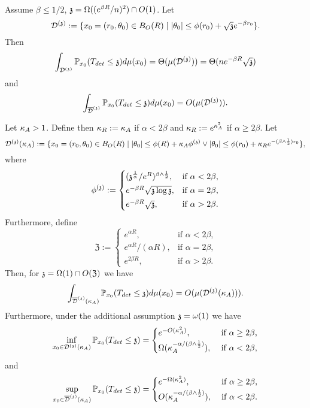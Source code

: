 \begin{theorem}\label{thm:mixedSmall} 
Assume $\beta \le 1/2$,  $\ss=\Omega((e^{\beta R}/n)^2)\cap O(1)$. Let
\begin{equation}\label{mix:lower:defD}
\dt := \{ x_0=(r_0,\theta_0)\in B_O(R) \mid |\theta_0|\leq \phi(r_0) +\sqrt{\ss}e^{-\beta r_0} \}. 
\end{equation}
Then 
\[
\int_{\dt} \PP_{x_0}(T_{det}\leq\ss)d\mu(x_0)=\Theta(\mu(\dt))=\Theta(n e^{-\beta R}\sqrt{\ss})
\]
and 
\[
\int_{\ndt} \PP_{x_0}(T_{det}\leq\ss)d\mu(x_0)=O(\mu(\dt)).
\]
\end{theorem}
\begin{theorem}\label{thm:mixedLarge}
Let $\KA > 1$. Define then $\KR:=\KA$ if $\alpha < 2\beta$ and $\KR:=e^{\KA^2}$ if $\alpha \ge 2\beta$. Let 
\[
\dt(\KA):=\{x_0=(r_0,\theta_0)\in B_O(R) \mid |\theta_0|\leq\phi(R)+\KA\phis \vee |\theta_0|\leq \phi(r_0)+\KR e^{-(\beta\wedge\frac12) r_0}\}, 
\]
where 
\[\phis:=\begin{cases}
(\ss^{\frac{1}{\alpha}}/e^R)^{\beta\wedge\frac{1}{2}}, 
 & \text{if $\alpha<2\beta$},\\[2pt]
e^{-\beta R}\sqrt{\ss \log\ss}, & \text{if $\alpha=2\beta$},\\[2pt]
e^{-\beta R}\sqrt{\ss},&\text{if $\alpha>2\beta$}.
\end{cases}
\]
Furthermore, define $$\mathfrak{Z} := \begin{cases}
e^{\alpha R}, &
\text{if $\alpha < 2\beta$,} \\
e^{\alpha R}/(\alpha R), &
\text{if $\alpha=2\beta$,} \\
e^{2\beta R}, & \text{if $\alpha > 2\beta$.} 
\end{cases} $$
Then, for $\ss=\Omega(1)\cap O(\mathfrak{Z})$ we have 
\[
\int_{\ndt(\KA)} \PP_{x_0}(T_{det}\leq\ss)d\mu(x_0)=O(\mu(\dt(\KA))).
\]
Furthermore, under the additional assumption $\ss=\omega(1)$ we have
$$
\inf_{x_0\in\dt(\KA)}\P_{x_0}(T_{det}\leq \ss) =
\begin{cases}
e^{-O(\KA^2)},
& \text{ if $\alpha\geq2\beta$,} \\[2pt]
\Omega(\KA^{-\alpha/(\beta\wedge\frac12)}),
& \text{ if $\alpha<2\beta$,} 
\end{cases}
$$
and
\[
\sup_{x_0\in\ndt(\KA)}\P_{x_0}(T_{det}\leq \ss) =
\begin{cases}
e^{-\Omega(\KA^2)},
& \text{ if $\alpha\geq2\beta$,} \\[2pt]
O(\KA^{-\alpha/(\beta\wedge\frac12)}),
& \text{ if $\alpha<2\beta$.} 
\end{cases}
\]
\end{theorem}


